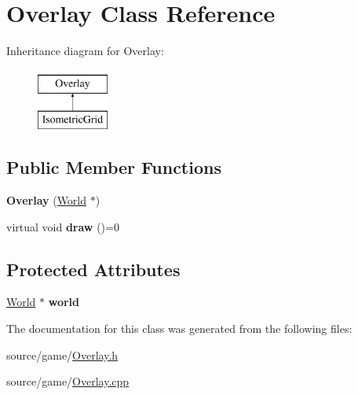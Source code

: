 \hypertarget{classOverlay}{
\section{Overlay Class Reference}
\label{classOverlay}
}
Inheritance diagram for Overlay:\begin{figure}[H]
\begin{center}
\leavevmode
\includegraphics[height=2cm]{classOverlay}
\end{center}
\end{figure}
\subsection*{Public Member Functions}
\begin{DoxyCompactItemize}
\item 
\hypertarget{classOverlay_aecb2ad2cea6041a1b1e332e041daeb13}{
{\bfseries Overlay} (\hyperlink{classWorld}{World} $\ast$)}
\label{classOverlay_aecb2ad2cea6041a1b1e332e041daeb13}

\item 
\hypertarget{classOverlay_a384639128697df8c44c3801ae9212be3}{
virtual void {\bfseries draw} ()=0}
\label{classOverlay_a384639128697df8c44c3801ae9212be3}

\end{DoxyCompactItemize}
\subsection*{Protected Attributes}
\begin{DoxyCompactItemize}
\item 
\hypertarget{classOverlay_aa0de2439856791f770c9e2e9bdc5b613}{
\hyperlink{classWorld}{World} $\ast$ {\bfseries world}}
\label{classOverlay_aa0de2439856791f770c9e2e9bdc5b613}

\end{DoxyCompactItemize}


The documentation for this class was generated from the following files:\begin{DoxyCompactItemize}
\item 
source/game/\hyperlink{Overlay_8h}{Overlay.h}\item 
source/game/\hyperlink{Overlay_8cpp}{Overlay.cpp}\end{DoxyCompactItemize}
